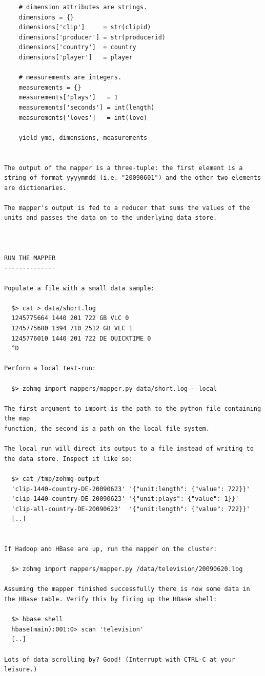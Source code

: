 \begin{verbatim}
    # dimension attributes are strings.
    dimensions = {}
    dimensions['clip']     = str(clipid)
    dimensions['producer'] = str(producerid)
    dimensions['country']  = country
    dimensions['player']   = player

    # measurements are integers.
    measurements = {}
    measurements['plays']   = 1
    measurements['seconds'] = int(length)
    measurements['loves']   = int(love)

    yield ymd, dimensions, measurements


The output of the mapper is a three-tuple: the first element is a
string of format yyyymmdd (i.e. "20090601") and the other two elements
are dictionaries.

The mapper's output is fed to a reducer that sums the values of the
units and passes the data on to the underlying data store.



RUN THE MAPPER
--------------

Populate a file with a small data sample:

  $> cat > data/short.log
  1245775664 1440 201 722 GB VLC 0
  1245775680 1394 710 2512 GB VLC 1
  1245776010 1440 201 722 DE QUICKTIME 0
  ^D

Perform a local test-run:

  $> zohmg import mappers/mapper.py data/short.log --local

The first argument to import is the path to the python file containing the map
function, the second is a path on the local file system.

The local run will direct its output to a file instead of writing to
the data store. Inspect it like so:

  $> cat /tmp/zohmg-output
  'clip-1440-country-DE-20090623' '{"unit:length": {"value": 722}}'
  'clip-1440-country-DE-20090623' '{"unit:plays": {"value": 1}}'
  'clip-all-country-DE-20090623'  '{"unit:length": {"value": 722}}'
  [..]


If Hadoop and HBase are up, run the mapper on the cluster:

  $> zohmg import mappers/mapper.py /data/television/20090620.log

Assuming the mapper finished successfully there is now some data in
the HBase table. Verify this by firing up the HBase shell:

  $> hbase shell
  hbase(main):001:0> scan 'television'
  [..]

Lots of data scrolling by? Good! (Interrupt with CTRL-C at your leisure.)



\end{verbatim}
